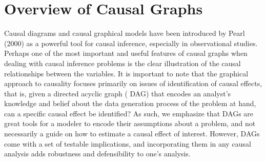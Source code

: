 \section{Overview of Causal Graphs}

Causal diagrams and causal graphical models have been introduced by Pearl 
(2000) as a powerful tool for causal inference, especially in observational 
studies. Perhaps one of the most important and useful features of causal 
graphs when dealing with causal inference problems is the clear illustration 
of the causal relationships between the variables. It is important to note 
that the graphical approach to causality focuses primarily on issues of 
identification of causal effects, that is, given a directed acyclic graph (
DAG) that encodes an analyst's knowledge and belief about the data 
generation process of the problem at hand, can a specific causal effect be 
identified? As such, we emphasize that DAGs are great tools for a modeler to 
encode their assumptions about a problem, and not necessarily a guide on how 
to estimate a causal effect of interest. However, DAGs come with a set of 
testable implications, and incorporating them in any causal analysis adds 
robustness and defensibility to one's analysis. 




\blindtext[2]